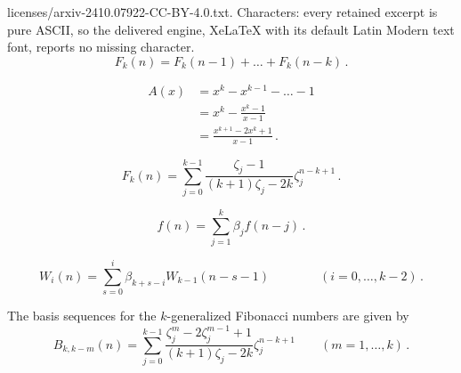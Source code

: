 \documentclass[10pt,a4paper]{amsart}
\begin{document}
licenses/arxiv-2410.07922-CC-BY-4.0.txt. Characters: every retained excerpt is pure ASCII, so the delivered engine, XeLaTeX with its default Latin Modern text font, reports no missing character.
\begin{equation}
\label{eq:rec_Fnk}
F_k(n) = F_k(n-1) +\dots +F_k(n-k) \,.
\end{equation}

\begin{equation}
\label{eq:A_frac}
\begin{split}
A(x) &= x^k -x^{k-1} -\dots -1
\\
&= x^k - \frac{x^k-1}{x-1}
\\
&= \frac{x^{k+1}-2x^k+1}{x-1} \,.
\end{split}
\end{equation}

\begin{equation}
\label{eq:sol_Fnk}
F_k(n) = \sum_{j=0}^{k-1} \frac{\zeta_j-1}{(k+1)\zeta_j-2k} \zeta_j^{n-k+1} \,.
\end{equation}

\begin{equation}
\label{eq:W_rec}
f(n) = \sum_{j=1}^k \beta_j f(n-j) \,.
\end{equation}

\begin{equation}
\label{eq:W_basis}
W_i(n) = \sum_{s=0}^i \beta_{k+s-i} W_{k-1}(n-s-1) \qquad\qquad (i=0,\dots,k-2) \,.
\end{equation}

\begin{proposition}
The basis sequences for the $k$-generalized Fibonacci numbers are given by
\begin{equation}
\label{eq:Fnk_basis_sum_roots}
B_{k,k-m}(n)
= \sum_{j=0}^{k-1} \frac{\zeta_j^m-2\zeta_j^{m-1}+1}{(k+1)\zeta_j-2k} \zeta_j^{n-k+1} \qquad (m=1,\dots,k) \,.
\end{equation}
\end{proposition}
\end{document}
